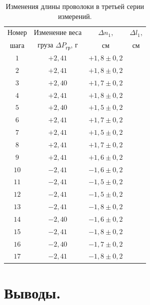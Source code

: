 \documentclass[a4paper,11pt]{article}
\begin{document}
\begin{table}[h!]
\centering
\begin{tabular}{ ||c|c|c|c|| }
  \hline
  Номер & Изменение веса & $\Delta n_{1}$, & $\Delta l_{1}$, \\
  шага & груза $\Delta P_{гр}$, $г$ & $см$ & $см$ \\
  \hline
  $1$ & $+2,41$ & $+1,8 \pm 0,2$ & \\
  $2$ & $+2,41$ & $+1,8 \pm 0,2$ & \\
  $3$ & $+2,40$ & $+1,7 \pm 0,2$ & \\
  $4$ & $+2,41$ & $+1,8 \pm 0,2$ & \\
  $5$ & $+2,40$ & $+1,5 \pm 0,2$ & \\
  $6$ & $+2,41$ & $+1,7 \pm 0,2$ & \\
  $7$ & $+2,41$ & $+1,5 \pm 0,2$ & \\
  $8$ & $+2,41$ & $+1,7 \pm 0,2$ & \\
  $9$ & $+2,41$ & $+1,6 \pm 0,2$ & \\
  $10$ & $-2,41$ & $-1,6 \pm 0,2$ & \\
  $11$ & $-2,41$ & $-1,5 \pm 0,2$ & \\
  $12$ & $-2,41$ & $-1,5 \pm 0,2$ & \\
  $13$ & $-2,41$ & $-1,8 \pm 0,2$ & \\
  $14$ & $-2,40$ & $-1,6 \pm 0,2$ & \\
  $15$ & $-2,41$ & $-1,8 \pm 0,2$ & \\
  $16$ & $-2,40$ & $-1,7 \pm 0,2$ & \\
  $17$ & $-2,41$ & $-1,8 \pm 0,2$ & \\
  \hline
\end{tabular}
\caption{Изменения длины проволоки в третьей серии измерений.}
\label{table:tab4}
\end{table}
\section{Выводы.}
\end{document}
